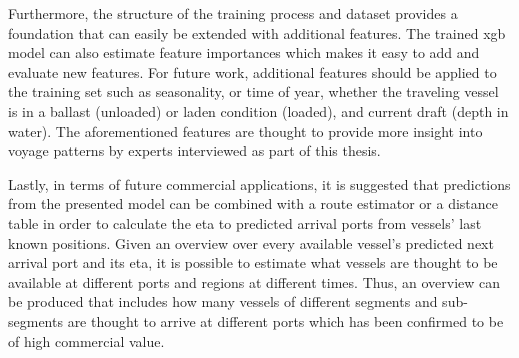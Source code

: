 Furthermore, the structure of the training process and dataset provides a foundation that can easily be extended with additional features. The trained \acrfull{xgb} model can also estimate feature importances which makes it easy to add and evaluate new features. For future work, additional features should be applied to the training set such as seasonality, or time of year, whether the traveling vessel is in a ballast (unloaded) or laden condition (loaded), and current draft (depth in water). The aforementioned features are thought to provide more insight into voyage patterns by experts interviewed as part of this thesis.

Lastly, in terms of future commercial applications, it is suggested that predictions from the presented model can be combined with a route estimator or a distance table in order to calculate the \acrfull{eta} to predicted arrival ports from vessels' last known positions. Given an overview over every available vessel's predicted next arrival port and its \acrshort{eta}, it is possible to estimate what vessels are thought to be available at different ports and regions at different times. Thus, an overview can be produced that includes how many vessels of different segments and sub-segments are thought to arrive at different ports which has been confirmed to be of high commercial value.
